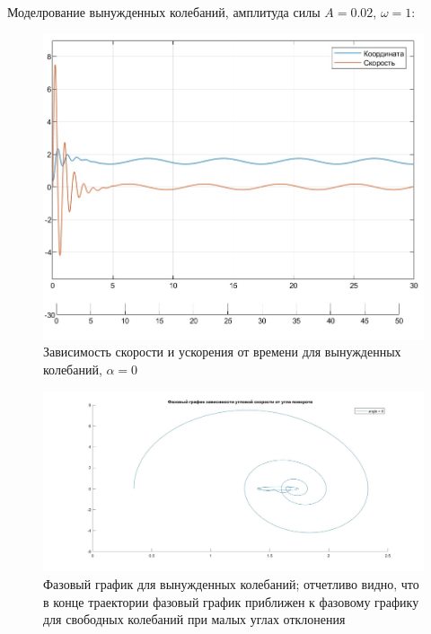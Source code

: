 \documentclass{article}
\begin{document}
	Моделрование вынужденных колебаний, амплитуда силы $A = 0.02$, $\omega = 1$:
	\begin{figure}[H]
		\centering
		\includegraphics[width=0.7\linewidth]{vinuzhd}
		\caption{Зависимость скорости и ускорения от времени для вынужденных колебаний, $\alpha = 0$}
		\label{fig:vinuzhd}
	\end{figure}
	\begin{figure}[H]
		\centering
		\includegraphics[width=1\linewidth]{pphase3}
		\caption{Фазовый график для вынужденных колебаний; отчетливо видно, что в конце траектории фазовый график приближен к фазовому графику для свободных колебаний при малых углах отклонения}
		\label{fig:pphase3}
	\end{figure}
	
	
\end{document}
